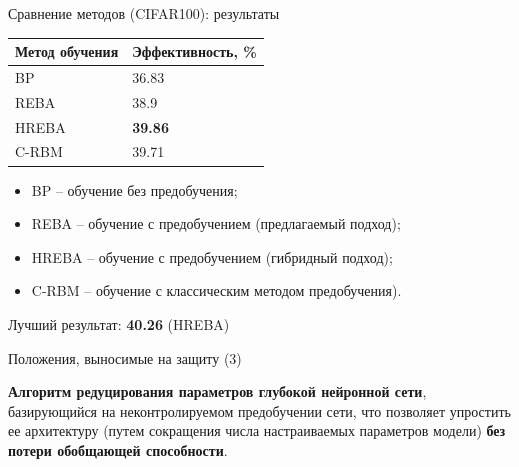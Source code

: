\documentclass[10pt]{beamer}
\begin{document}
        \begin{frame}{Сравнение методов (CIFAR100): результаты}
            \begin{table} [!h]
              \small
            \centering
            \begin{tabular}{| p{3cm} | p{3cm} |}
              \hline
                \textbf{Метод обучения} & \textbf{Эффективность, \%}\\
                \hline
                BP & 36.83\\
                \hline
                REBA & 38.9\\
                \hline
                HREBA & \textbf{39.86}\\
                \hline
                C-RBM & 39.71\\
                \hline
            \end{tabular}
            \end{table}
            \begin{itemize}
                \item BP -- обучение без предобучения; 
                \item REBA -- обучение с предобучением (предлагаемый подход); 
                \item HREBA -- обучение с предобучением (гибридный подход);
                \item C-RBM -- обучение с классическим методом предобучения).
            \end{itemize}
            Лучший результат: \textbf{40.26} (HREBA)\\
        \end{frame}

        \begin{frame}{Положения, выносимые на защиту (3)}
            \begin{block}{3}
                \large
                \textbf{Алгоритм редуцирования параметров глубокой нейронной сети}, базирующийся на неконтролируемом предобучении сети, что позволяет упростить ее архитектуру (путем сокращения числа настраиваемых параметров модели) \textbf{без потери обобщающей способности}.
            \end{block}
        \end{frame}
\end{document}
